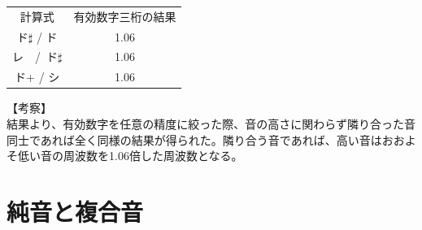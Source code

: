 \documentclass[uplatex, titlepage]{jsarticle}
\begin{document}
\begin{table}[H]
  \centering
  \begin{tabular}{cc}%
  計算式 & 有効数字三桁の結果\\ %
  ド$\sharp$ / ド & 1.06\\ %
  レ\ \ /\ ド$\sharp$ & 1.06\\ %
  ド+ / シ & 1.06\\ %
  \end{tabular}
\end{table}

【考察】\\
  結果より、有効数字を任意の精度に絞った際、音の高さに関わらず隣り合った音同士であれば全く同様の結果が得られた。隣り合う音であれば、高い音はおおよそ低い音の周波数を1.06倍した周波数となる。

\section{純音と複合音}
\end{document}
